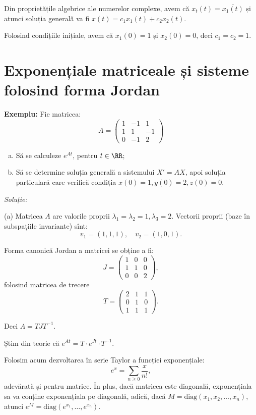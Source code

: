 Din proprietățile algebrice ale numerelor complexe, avem că $x_t(t) = \overline{x_1(t)}$ și atunci
soluția generală va fi $x(t) = c_1 x_1(t) + c_2 x_2(t)$.

Folosind condițiile inițiale, avem că $x_1(0) = 1$ și $x_2(0) = 0$, deci $c_1 = c_2 = 1$.


\section{Exponențiale matriceale și sisteme folosind forma Jordan}
\label{sec:jordan}

\textbf{Exemplu:} Fie matricea:
\[
  A = \begin{pmatrix}
    1 & -1 & 1 \\
    1 & 1 & -1 \\
    0 & -1 & 2 
  \end{pmatrix}
\]
\begin{enumerate}[(a)]
\item Să se calculeze $e^{At}$, pentru $t \in \RR$;
\item Să se determine soluția generală a sistemului $X' = AX$, apoi soluția particulară
  care verifică condiția $x(0) = 1, y(0) = 2, z(0) = 0$.
\end{enumerate}

\emph{Soluție:}

(a) Matricea $A$ are valorile proprii $\lambda_1 = \lambda_2 = 1, \lambda_3 = 2$.
Vectorii proprii (baze în subspațiile invariante) sînt:
\[
  v_1 = (1, 1, 1), \quad v_2 = (1, 0, 1).
\]

Forma canonică Jordan a matricei se obține a fi:
\[
  J = \begin{pmatrix}
    1 & 0 & 0 \\
    1 & 1 & 0 \\
    0 & 0 & 2
  \end{pmatrix},
\]
folosind matricea de trecere
\[
  T = \begin{pmatrix}
    2 & 1 & 1 \\ 0 & 1 & 0 \\ 1 & 1 & 1
  \end{pmatrix}.
\]

Deci $A = TJT^{-1}$.

Știm din teorie că $e^{At} = T \cdot e^{Jt} \cdot T^{-1}$.

Folosim acum dezvoltarea în serie Taylor a funcției exponențiale:
\[
  e^x = \sum_{n \geq 0} \frac{x}{n!},
\]
adevărată și pentru matrice. În plus, dacă matricea este diagonală,
exponențiala sa va conține ex\-po\-nen\-ți\-a\-la pe diagonală, adică, dacă
$M = \mathrm{diag}(x_1, x_2, \dots, x_n)$, atunci
$e^M = \mathrm{diag}(e^{x_1},\dots, e^{x_n})$.


